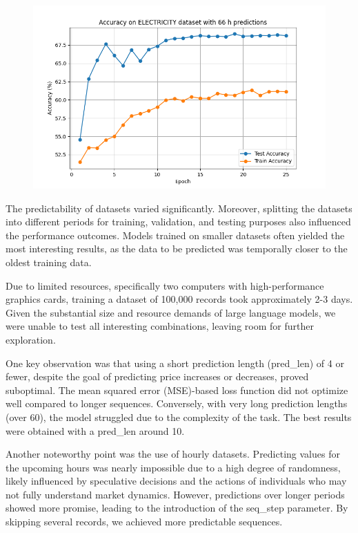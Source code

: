 \begin{figure}[h!]

	\centering

	\includegraphics[width=\linewidth]{"pictures/electricity_66h_results.png"}
	\caption{}

	\label{fig:electricity_fig}

\end{figure}

\FloatBarrier


The predictability of datasets varied significantly. Moreover, splitting the datasets into different periods for training, validation, and testing purposes also influenced the performance outcomes. Models trained on smaller datasets often yielded the most interesting results, as the data to be predicted was temporally closer to the oldest training data.

Due to limited resources, specifically two computers with high-performance graphics cards, training a dataset of 100,000 records took approximately 2-3 days. Given the substantial size and resource demands of large language models, we were unable to test all interesting combinations, leaving room for further exploration.

One key observation was that using a short prediction length (pred\_len) of 4 or fewer, despite the goal of predicting price increases or decreases, proved suboptimal. The mean squared error (MSE)-based loss function did not optimize well compared to longer sequences. Conversely, with very long prediction lengths (over 60), the model struggled due to the complexity of the task. The best results were obtained with a pred\_len around 10.

Another noteworthy point was the use of hourly datasets. Predicting values for the upcoming hours was nearly impossible due to a high degree of randomness, likely influenced by speculative decisions and the actions of individuals who may not fully understand market dynamics. However, predictions over longer periods showed more promise, leading to the introduction of the seq\_step parameter. By skipping several records, we achieved more predictable sequences.

